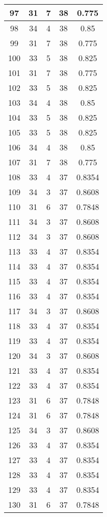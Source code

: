 \documentclass[letterpaper, 12pt]{article}
\begin{document}
\begin{longtable}{|c|c|c|c|c|}
\hline
97 & 31 & 7 & 38 & 0.775 \\
\hline
98 & 34 & 4 & 38 & 0.85 \\
\hline
99 & 31 & 7 & 38 & 0.775 \\
\hline
100 & 33 & 5 & 38 & 0.825 \\
\hline
101 & 31 & 7 & 38 & 0.775 \\
\hline
102 & 33 & 5 & 38 & 0.825 \\
\hline
103 & 34 & 4 & 38 & 0.85 \\
\hline
104 & 33 & 5 & 38 & 0.825 \\
\hline
105 & 33 & 5 & 38 & 0.825 \\
\hline
106 & 34 & 4 & 38 & 0.85 \\
\hline
107 & 31 & 7 & 38 & 0.775 \\
\hline
108 & 33 & 4 & 37 & 0.8354 \\
\hline
109 & 34 & 3 & 37 & 0.8608 \\
\hline
110 & 31 & 6 & 37 & 0.7848 \\
\hline
111 & 34 & 3 & 37 & 0.8608 \\
\hline
112 & 34 & 3 & 37 & 0.8608 \\
\hline
113 & 33 & 4 & 37 & 0.8354 \\
\hline
114 & 33 & 4 & 37 & 0.8354 \\
\hline
115 & 33 & 4 & 37 & 0.8354 \\
\hline
116 & 33 & 4 & 37 & 0.8354 \\
\hline
117 & 34 & 3 & 37 & 0.8608 \\
\hline
118 & 33 & 4 & 37 & 0.8354 \\
\hline
119 & 33 & 4 & 37 & 0.8354 \\
\hline
120 & 34 & 3 & 37 & 0.8608 \\
\hline
121 & 33 & 4 & 37 & 0.8354 \\
\hline
122 & 33 & 4 & 37 & 0.8354 \\
\hline
123 & 31 & 6 & 37 & 0.7848 \\
\hline
124 & 31 & 6 & 37 & 0.7848 \\
\hline
125 & 34 & 3 & 37 & 0.8608 \\
\hline
126 & 33 & 4 & 37 & 0.8354 \\
\hline
127 & 33 & 4 & 37 & 0.8354 \\
\hline
128 & 33 & 4 & 37 & 0.8354 \\
\hline
129 & 33 & 4 & 37 & 0.8354 \\
\hline
130 & 31 & 6 & 37 & 0.7848 \\

\end{longtable}
\end{document}
